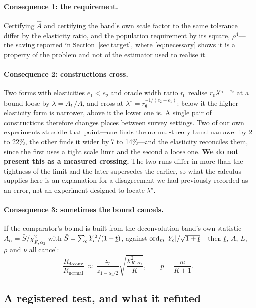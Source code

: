 \paragraph{Consequence 1: the requirement.} Certifying $\widehat A$ and
certifying the band's own scale factor to the same tolerance differ by the
elasticity ratio, and the population requirement by its square, $\rho^4$---the
saving reported in Section~\ref{sec:target}, where \eqref{eq:necessary} shows it
is a property of the problem and not of the estimator used to realise it.

\paragraph{Consequence 2: constructions cross.} Two forms with elasticities
$e_1<e_2$ and oracle width ratio $r_0$ realise $r_0\lambda^{e_1-e_2}$ at a bound
loose by $\lambda=A_U/A$, and cross at $\lambda^\star=r_0^{-1/(e_2-e_1)}$: below
it the higher-elasticity form is narrower, above it the lower one is. A single
pair of constructions therefore changes places between survey settings. Two of
our own experiments straddle that point---one finds the normal-theory band
narrower by 2 to 22\%, the other finds it wider by 7 to 14\%---and the
elasticity reconciles them, since the first uses a tight scale limit and the
second a loose one. \textbf{We do not present this as a measured crossing.} The
two runs differ in more than the tightness of the limit and the later supersedes
the earlier, so what the calculus supplies here is an explanation for a
disagreement we had previously recorded as an error, not an experiment designed
to locate $\lambda^\star$.

\paragraph{Consequence 3: sometimes the bound cancels.} If the comparator's bound
is built from the deconvolution band's own statistic---$A_U=\bar
S/\chi^2_{K,\alpha_2}$ with $\bar S=\sum_cY_c^2/(1+\underline t)$, against
$\operatorname{ord}_m|Y_c|/\sqrt{1+\underline t}$---then $\underline t$, $A$, $L$, $\rho$ and
$\nu$ all cancel:
\begin{equation}\label{eq:S4}
\frac{R_{\mathrm{deconv}}}{R_{\mathrm{normal}}}\ \approx\
\frac{z_p}{z_{1-\alpha_1/2}}\sqrt{\frac{\chi^2_{K,\alpha_2}}{K}},
\qquad p=\frac{m}{K+1}.
\end{equation}

\subsection{A registered test, and what it refuted}

